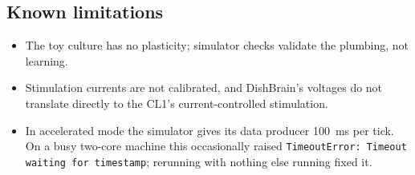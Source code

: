 \documentclass[11pt,a4paper]{article}
\newcommand{\code}[1]{\texttt{#1}}
\begin{document}
\subsection*{Known limitations}
\begin{itemize}[leftmargin=2em, nosep]
  \item The toy culture has no plasticity; simulator checks validate the plumbing, not learning.
  \item Stimulation currents are not calibrated, and DishBrain's voltages do not translate
        directly to the CL1's current-controlled stimulation.
  \item In accelerated mode the simulator gives its data producer \SI{100}{\milli\second} per
        tick. On a busy two-core machine this occasionally raised
        \code{TimeoutError: Timeout waiting for timestamp}; rerunning with nothing else running
        fixed it.
\end{itemize}



\end{document}
